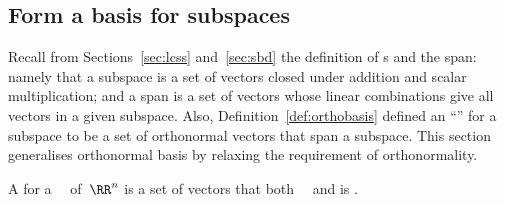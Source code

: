 \subsection{Form a basis for subspaces}


Recall from Sections~\ref{sec:lcss} and~\ref{sec:sbd} the definition of s and the span: namely that a subspace is a set of vectors closed under addition and scalar multiplication; and a span is a set of vectors whose linear combinations give all vectors in a given subspace.
Also, Definition~\ref{def:orthobasis} defined an ``'' for a subspace to be a set of orthonormal vectors that span a subspace.
This section generalises orthonormal basis by relaxing the requirement of orthonormality.


\begin{definition} \label{def:basis} 
A  for a ~\WW\ of~\(\RR^n\) is a set of  vectors that both ~\WW\ and is .
\end{definition}

